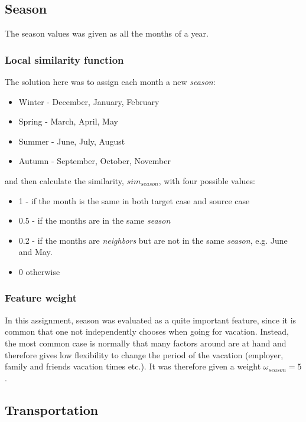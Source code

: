 \documentclass[12pt]{article}
\begin{document}
\subsection{Season}
\label{sec:season}

The season values was given as all the months of a year. 

\subsubsection{Local similarity function}
\label{sec:season-sim}

The solution here was to assign each month a new \textit{season}: 

\begin{itemize}
\item Winter - December, January, February
\item Spring - March, April, May
\item Summer - June, July, August
\item Autumn - September, October, November
\end{itemize}

and then calculate the similarity, $sim_{season}$, with four possible values:

\begin{itemize}
\item 1 - if the month is the same in both target case and source case
\item 0.5 - if the months are in the same \textit{season}
\item 0.2 - if the months are \textit{neighbors} but are not in the same \textit{season}, e.g. June and May.
\item 0 otherwise
\end{itemize}

\subsubsection{Feature weight}
\label{sec:season-weight}

In this assignment, season was evaluated as a quite important feature, since it is common that one not independently chooses when going for vacation. Instead, the most common case is normally that many factors around are at hand and therefore gives low flexibility to change the period of the vacation (employer, family and friends vacation times etc.). It was therefore given a weight $\omega_{season}=5$.

\subsection{Transportation}
\label{sec:transport}
\end{document}
